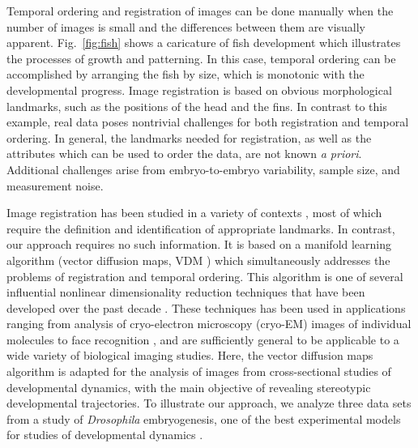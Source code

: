 \documentclass{pnastwo}
\makeatletter
\newcommand{\fig}[0]{Fig.}
\newcommand{\customlabel}[2]{%
\protected@write \@auxout {}{\string \newlabel {#1}{{#2}{}}}}
\makeatother
\begin{document}
\begin{article}
Temporal ordering and registration of images can be done manually
when the number of images is small and the differences between them are visually apparent. 
%
\fig~\ref{fig:fish} shows a caricature of fish development which illustrates the processes of growth and patterning.
%
In this case, temporal ordering can be accomplished by arranging the fish by size, which is monotonic with the developmental progress.
%
Image registration is based on obvious morphological landmarks, such as the positions of the head and the fins.
%
In contrast to this example, real data poses nontrivial challenges for both registration and temporal ordering.
%
In general, the landmarks needed for registration, as well as the attributes which can be used to order the data, are not known {\it a priori}.
%
Additional challenges arise from embryo-to-embryo variability, sample size, and measurement noise.


Image registration has been studied in a variety of contexts \cite{zitova2003image, rowley1998rotation, hajnal2010medical, greenspan1994rotation, zhao2003face}, 
most of which require the definition and identification of appropriate landmarks.
%
In contrast, our approach requires no such information. 
%
It is based on a manifold learning algorithm (vector diffusion maps, VDM \cite{singer2012vector}) which simultaneously addresses the problems of registration and temporal ordering. 
%
This algorithm is one of several influential nonlinear dimensionality reduction techniques that have been developed over the past decade \cite{Belkin2003, coifman2005geometric, coifman2006geometric, tenenbaum2000global, roweis2000nonlinear}. 
%
These techniques has been used in
applications ranging from analysis of cryo-electron microscopy (cryo-EM) images of individual molecules  \cite{zhao2014rotationally, singer2011viewing} to face recognition \cite{lafon2006data}, and are sufficiently general to be applicable to a wide variety of biological imaging studies.
%
Here, the vector diffusion maps algorithm is adapted for the analysis of images from cross-sectional studies of developmental dynamics, with the main objective of revealing stereotypic developmental trajectories.
%
To illustrate our approach, we analyze three data sets from a study of {\it Drosophila} embryogenesis, one of the best experimental models for studies of developmental dynamics \cite{jaeger2012drosophila}.



\end{article}
\end{document}

